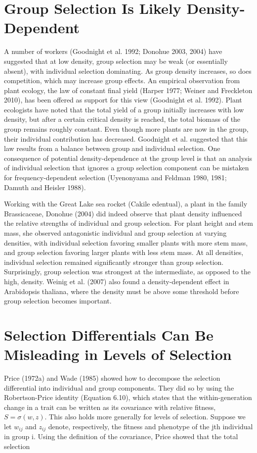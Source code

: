 \documentclass{article}
\begin{document}
\section{Group Selection Is Likely Density-Dependent}
A number of workers (Goodnight et al. 1992; Donohue 2003, 2004) have suggested that at low density, group selection may be weak (or essentially absent), with individual selection dominating. As group density increases, so does competition, which may increase group effects. An empirical observation from plant ecology, the law of constant final yield (Harper 1977; Weiner and Freckleton 2010), has been offered as support for this view (Goodnight et al. 1992). Plant ecologists have noted that the total yield of a group initially increases with low density, but after a certain critical density is reached, the total biomass of the group remains roughly constant. Even though more plants are now in the group, their individual contribution has decreased. Goodnight et al. suggested that this law results from a balance between group and individual selection. One consequence of potential density-dependence at the group level is that an analysis of individual selection that ignores a group selection component can be mistaken for frequency-dependent selection (Uyenonyama and Feldman 1980, 1981; Damuth and Heisler 1988).

Working with the Great Lake sea rocket (Cakile edentual), a plant in the family Brassicaceae, Donohue (2004) did indeed observe that plant density influenced the relative strengths of individual and group selection. For plant height and stem mass, she observed antagonistic individual and group selection at varying densities, with individual selection favoring smaller plants with more stem mass, and group selection favoring larger plants with less stem mass. At all densities, individual selection remained significantly stronger than group selection. Surprisingly, group selection was strongest at the intermediate, as opposed to the high, density. Weinig et al. (2007) also found a density-dependent effect in Arabidopsis thaliana, where the density must be above some threshold before group selection becomes important.

\section{Selection Differentials Can Be Misleading in Levels of Selection}
Price (1972a) and Wade (1985) showed how to decompose the selection differential into individual and group components. They did so by using the Robertson-Price identity (Equation 6.10), which states that the within-generation change in a trait can be written as its covariance with relative fitness,  $ S = \sigma(w, z) $. This also holds more generally for levels of selection. Suppose we let  $ w_{ij} $ and  $ z_{ij} $ denote, respectively, the fitness and phenotype of the jth individual in group i. Using the definition of the covariance, Price showed that the total selection
\end{document}
